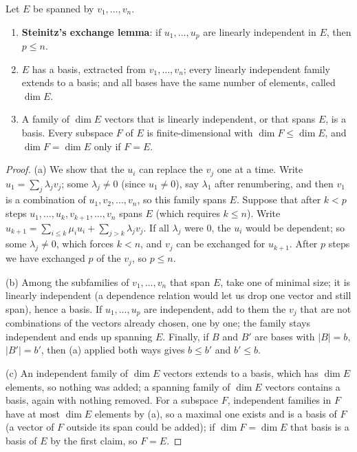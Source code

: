 \begin{theoremx}
Let $E$ be spanned by $v_1,\dots,v_n$.
\begin{enumerate}[label=(\alph*)]
\item \textbf{Steinitz's exchange lemma}: if $u_1,\dots,u_p$ are linearly independent in $E$, then $p\le n$.
\item $E$ has a basis, extracted from $v_1,\dots,v_n$; every linearly independent family extends to a basis; and all bases have the same number of elements, called $\dim E$.
\item A family of $\dim E$ vectors that is linearly independent, or that spans $E$, is a basis. Every subspace $F$ of $E$ is finite-dimensional with $\dim F\le\dim E$, and $\dim F=\dim E$ only if $F=E$.
\end{enumerate}
\end{theoremx}
\begin{proof}
(a) We show that the $u_i$ can replace the $v_j$ one at a time. Write $u_1=\sum_j\lambda_jv_j$; some $\lambda_j\ne0$ (since $u_1\ne0$), say $\lambda_1$ after renumbering, and then $v_1$ is a combination of $u_1,v_2,\dots,v_n$, so this family spans $E$. Suppose that after $k<p$ steps $u_1,\dots,u_k,v_{k+1},\dots,v_n$ spans $E$ (which requires $k\le n$). Write $u_{k+1}=\sum_{i\le k}\mu_iu_i+\sum_{j>k}\lambda_jv_j$. If all $\lambda_j$ were $0$, the $u_i$ would be dependent; so some $\lambda_j\ne0$, which forces $k<n$, and $v_j$ can be exchanged for $u_{k+1}$. After $p$ steps we have exchanged $p$ of the $v_j$, so $p\le n$.

(b) Among the subfamilies of $v_1,\dots,v_n$ that span $E$, take one of minimal size; it is linearly independent (a dependence relation would let us drop one vector and still span), hence a basis. If $u_1,\dots,u_p$ are independent, add to them the $v_j$ that are not combinations of the vectors already chosen, one by one; the family stays independent and ends up spanning $E$. Finally, if $B$ and $B'$ are bases with $|B|=b$, $|B'|=b'$, then (a) applied both ways gives $b\le b'$ and $b'\le b$.

(c) An independent family of $\dim E$ vectors extends to a basis, which has $\dim E$ elements, so nothing was added; a spanning family of $\dim E$ vectors contains a basis, again with nothing removed. For a subspace $F$, independent families in $F$ have at most $\dim E$ elements by (a), so a maximal one exists and is a basis of $F$ (a vector of $F$ outside its span could be added); if $\dim F=\dim E$ that basis is a basis of $E$ by the first claim, so $F=E$.
\end{proof}


